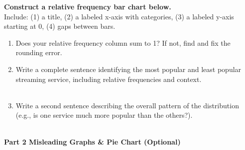 \documentclass[10pt]{article}
\begin{document}
\vspace{0.14in}

\noindent\textbf{Construct a relative frequency bar chart below.}\\[2pt]
\small Include: (1) a title, (2) a labeled x-axis with categories, (3) a labeled
y-axis starting at 0, (4) gaps between bars.

\vspace{8pt}
\begin{tcolorbox}[colback=white, colframe=navy, boxrule=0.8pt, arc=2mm,
    left=3mm, right=3mm, top=2mm, bottom=2mm, height=2.8in]
\end{tcolorbox}

\vspace{0.12in}

\begin{enumerate}[leftmargin=1.5em, itemsep=8pt]
  \item Does your relative frequency column sum to 1? \blank{1cm}
        If not, find and fix the rounding error.

  \item Write a complete sentence identifying the most popular and least popular
        streaming service, including relative frequencies and context.\\[5pt]
        \writeline\\[1pt]\writeline

  \item Write a second sentence describing the overall pattern of the distribution
        (e.g., is one service much more popular than the others?).\\[5pt]
        \writeline\\[1pt]\writeline
\end{enumerate}

\vspace{0.14in}

{\large\bfseries\color{navy} Part 2 \quad Misleading Graphs \& Pie Chart (Optional)}

\vspace{0.1in}
\end{document}
